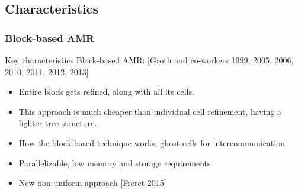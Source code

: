 \documentclass{beamer}
\begin{document}

\subsection{Characteristics}
\begin{frame}%
\frametitle{Block-based AMR}
\tiny
\begin{minipage}[t][1\textheight]{1\textwidth}
\vspace{-15pt}
\begin{exampleblock}{Key characteristics}
Block-based AMR: [Groth and co-workers 1999, 2005, 2006, 2010, 2011, 2012, 2013] \newline

\begin{itemize}
\tiny
\item Entire block gets refined, along with all its cells. 
\item This approach is much cheaper than individual cell refinement, having a lighter tree structure.
\item How the block-based technique works; ghost cells for intercommunication 
\item Parallelizable, low memory and storage requirements
\item New non-uniform approach [Freret 2015]
\end{itemize}


\end{exampleblock}
\end{minipage}
\end{frame}
\end{document}
